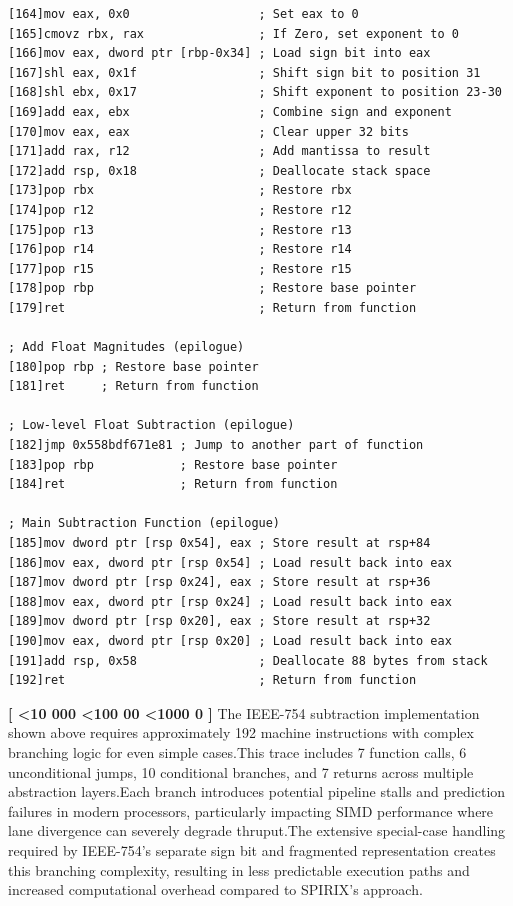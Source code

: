 \documentclass[12pt,letter]{article}
\newcounter{paracounter}
\newcommand{\ppara}[1]{
\noindent\textbf{[\formatparanumber{\arabic{paracounter}}]} \begingroup\RaggedRight\sloppy\hbadness=10000 #1\par\endgroup%
\stepcounter{paracounter}%
}
\newcommand{\formatparanumber}[1]{%
\ifnum#1<10 000%
\else\ifnum#1<100 00%
\else\ifnum#1<1000 0%
\fi\fi\fi#1%
}
\begin{document}
\begin{lstlisting}[style=rust, caption={Annotated Binary32 Normal Case Subtraction Instruction Trace}, label={fig:ieee_subtract}]
[164]mov eax, 0x0                  ; Set eax to 0
[165]cmovz rbx, rax                ; If Zero, set exponent to 0
[166]mov eax, dword ptr [rbp-0x34] ; Load sign bit into eax
[167]shl eax, 0x1f                 ; Shift sign bit to position 31
[168]shl ebx, 0x17                 ; Shift exponent to position 23-30
[169]add eax, ebx                  ; Combine sign and exponent
[170]mov eax, eax                  ; Clear upper 32 bits
[171]add rax, r12                  ; Add mantissa to result
[172]add rsp, 0x18                 ; Deallocate stack space
[173]pop rbx                       ; Restore rbx
[174]pop r12                       ; Restore r12
[175]pop r13                       ; Restore r13
[176]pop r14                       ; Restore r14
[177]pop r15                       ; Restore r15
[178]pop rbp                       ; Restore base pointer
[179]ret                           ; Return from function

; Add Float Magnitudes (epilogue)
[180]pop rbp ; Restore base pointer
[181]ret     ; Return from function

; Low-level Float Subtraction (epilogue)
[182]jmp 0x558bdf671e81 ; Jump to another part of function
[183]pop rbp            ; Restore base pointer
[184]ret                ; Return from function

; Main Subtraction Function (epilogue)
[185]mov dword ptr [rsp 0x54], eax ; Store result at rsp+84
[186]mov eax, dword ptr [rsp 0x54] ; Load result back into eax
[187]mov dword ptr [rsp 0x24], eax ; Store result at rsp+36
[188]mov eax, dword ptr [rsp 0x24] ; Load result back into eax
[189]mov dword ptr [rsp 0x20], eax ; Store result at rsp+32
[190]mov eax, dword ptr [rsp 0x20] ; Load result back into eax
[191]add rsp, 0x58                 ; Deallocate 88 bytes from stack
[192]ret                           ; Return from function

\end{lstlisting}

\ppara{The IEEE-754 subtraction implementation shown above requires approximately 192 machine instructions with complex branching logic for even simple cases.\hspace{0.2cm}This trace includes 7 function calls, 6 unconditional jumps, 10 conditional branches, and 7 returns across multiple abstraction layers.\hspace{0.2cm}Each branch introduces potential pipeline stalls and prediction failures in modern processors, particularly impacting SIMD performance where lane divergence can severely degrade thruput.\hspace{0.2cm}The extensive special-case handling required by IEEE-754's separate sign bit and fragmented representation creates this branching complexity, resulting in less predictable execution paths and increased computational overhead compared to SPIRIX's approach.}
\end{document}
